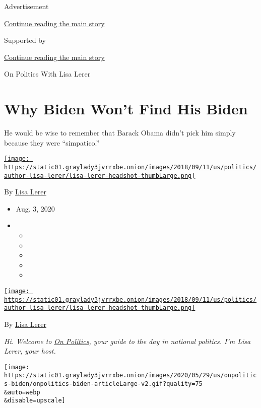 Advertisement

\protect\hyperlink{after-top}{Continue reading the main story}

Supported by

\protect\hyperlink{after-sponsor}{Continue reading the main story}

On Politics With Lisa Lerer

\hypertarget{why-biden-wont-find-his-biden}{%
\section{Why Biden Won't Find His
Biden}\label{why-biden-wont-find-his-biden}}

He would be wise to remember that Barack Obama didn't pick him simply
because they were ``simpatico.''

\href{https://www.nytimes3xbfgragh.onion/by/lisa-lerer}{\texttt{[image: https://static01.graylady3jvrrxbe.onion/images/2018/09/11/us/politics/author-lisa-lerer/lisa-lerer-headshot-thumbLarge.png]}}

By \href{https://www.nytimes3xbfgragh.onion/by/lisa-lerer}{Lisa Lerer}

\begin{itemize}
\item
  Aug. 3, 2020
\item
  \begin{itemize}
  \item
  \item
  \item
  \item
  \item
  \end{itemize}
\end{itemize}

\href{https://www.nytimes3xbfgragh.onion/by/lisa-lerer}{\texttt{[image: https://static01.graylady3jvrrxbe.onion/images/2018/09/11/us/politics/author-lisa-lerer/lisa-lerer-headshot-thumbLarge.png]}}

By \href{https://www.nytimes3xbfgragh.onion/by/lisa-lerer}{Lisa Lerer}

\emph{Hi. Welcome to}
\href{https://www.nytimes3xbfgragh.onion/spotlight/on-politics}{\emph{On
Politics}}\emph{, your guide to the day in national politics. I'm Lisa
Lerer, your host.}

\texttt{[image: https://static01.graylady3jvrrxbe.onion/images/2020/05/29/us/onpolitics-biden/onpolitics-biden-articleLarge-v2.gif?quality=75\\\&auto=webp\\\&disable=upscale]}

